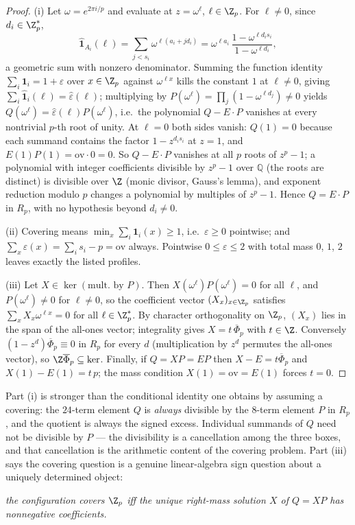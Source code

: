 \begin{proof}
(i) Let $\omega=e^{2\pi i/p}$ and evaluate at $z=\omega^\ell$,
$\ell\in\Z_p$. For $\ell\ne 0$, since $d_i\in\Z_p^{*}$,
\[
\widehat{\mathbf 1}_{A_i}(\ell)
=\sum_{j<s_i}\omega^{\ell(a_i+jd_i)}
=\omega^{\ell a_i}\,\frac{1-\omega^{\ell d_i s_i}}{1-\omega^{\ell d_i}},
\]
a geometric sum with nonzero denominator. Summing the function identity
$\sum_i\mathbf 1_i=1+\varepsilon$ over $x\in\Z_p$ against $\omega^{\ell x}$
kills the constant $1$ at $\ell\ne0$, giving
$\sum_i\widehat{\mathbf 1}_i(\ell)=\widehat\varepsilon(\ell)$; multiplying by
$P(\omega^\ell)=\prod_j(1-\omega^{\ell d_j})\ne 0$ yields
$Q(\omega^\ell)=\widehat\varepsilon(\ell)P(\omega^\ell)$, i.e.\ the
polynomial $Q-E\cdot P$ vanishes at every nontrivial $p$-th root of unity.
At $\ell=0$ both sides vanish: $Q(1)=0$ because each summand contains the
factor $1-z^{d_is_i}$ at $z=1$, and $E(1)P(1)=\mathrm{ov}\cdot 0=0$. So
$Q-E\cdot P$ vanishes at all $p$ roots of $z^p-1$; a polynomial with integer
coefficients divisible by $z^p-1$ over $\mathbb{Q}$ (the roots are distinct) is
divisible over $\Z$ (monic divisor, Gauss's lemma), and exponent reduction
modulo $p$ changes a polynomial by multiples of $z^p-1$. Hence
$Q=E\cdot P$ in $R_p$, with no hypothesis beyond $d_i\ne 0$.

(ii) Covering means $\min_x\sum_i\mathbf 1_i(x)\ge 1$, i.e.\ $\varepsilon\ge
0$ pointwise; and $\sum_x\varepsilon(x)=\sum_i s_i-p=\mathrm{ov}$ always.
Pointwise $0\le\varepsilon\le 2$ with total mass $0$, $1$, $2$ leaves exactly
the listed profiles.

(iii) Let $X\in\ker(\text{mult.\ by }P)$. Then $X(\omega^\ell)P
(\omega^\ell)=0$ for all $\ell$, and $P(\omega^\ell)\ne 0$ for $\ell\ne 0$,
so the coefficient vector $(X_x)_{x\in\Z_p}$ satisfies
$\sum_x X_x\omega^{\ell x}=0$ for all $\ell\in\Z_p^{*}$. By character
orthogonality on $\Z_p$, $(X_x)$ lies in the span of the all-ones vector;
integrality gives $X=t\,\overline\Phi_p$ with $t\in\Z$. Conversely
$(1-z^{d})\overline\Phi_p\equiv 0$ in $R_p$ for every $d$ (multiplication by
$z^d$ permutes the all-ones vector), so $\Z\overline\Phi_p\subseteq\ker$.
Finally, if $Q=XP=EP$ then $X-E=t\overline\Phi_p$ and
$X(1)-E(1)=t\,p$; the mass condition $X(1)=\mathrm{ov}=E(1)$ forces $t=0$.
\end{proof}

Part (i) is stronger than the conditional identity one obtains by assuming a
covering: the $24$-term element $Q$ is \emph{always} divisible by the
$8$-term element $P$ in $R_p$, and the quotient is always the signed excess.
Individual summands of $Q$ need not be divisible by $P$ --- the divisibility
is a cancellation among the three boxes, and that cancellation is the
arithmetic content of the covering problem. Part (iii) says the covering
question is a genuine linear-algebra sign question about a uniquely
determined object:
\begin{center}
\emph{the configuration covers $\Z_p$ iff the unique right-mass
solution $X$ of $Q=XP$ has nonnegative coefficients.}
\end{center}

